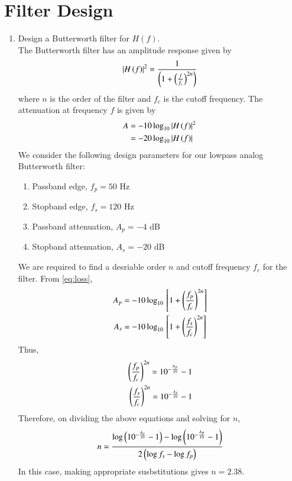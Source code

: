 \documentclass[journal,12pt,twocolumn]{IEEEtran}
\renewcommand\thesection{\arabic{section}}
\begin{document}
\section{Filter Design}
\begin{enumerate}[label=\thesection.\arabic*
,ref=\thesection.\theenumi]
\item Design a Butterworth filter for $H(f)$.\\
\solution The Butterworth filter has an amplitude response
given by
\begin{align}
    \left\vert H\left(f\right)\right\vert^2 = \frac{1}{\left(1 + \left(\frac{f}{f_c}\right)^{2n}\right)}
\end{align}
where $n$ is the order of the filter and $f_c$ is the cutoff
frequency. The attenuation at frequency $f$ is given by 
\begin{align}
    A &= -10\log_{10}\left\vert H\left(f\right)\right\vert^2 \\
      &= -20\log_{10}\left\vert H\left(f\right)\right\vert
    \label{eq:loss}
\end{align}
We consider the following design parameters for our
lowpass analog Butterworth filter:
\begin{enumerate}
    \item Passband edge, $f_p = 50$ Hz
    \item Stopband edge, $f_s = 120$ Hz
    \item Passband attenuation, $A_p = -4$ dB
    \item Stopband attenuation, $A_s = -20$ dB
\end{enumerate}
We are required to find a desriable order $n$ and cutoff
frequency $f_c$ for the filter. From \eqref{eq:loss},
\begin{align}
    A_p &= -10\log_{10}{}\left[1 + \left(\frac{f_p}{f_c}\right)^{2n}\right] \\
    A_s &= -10\log_{10}{}\left[1 + \left(\frac{f_s}{f_c}\right)^{2n}\right]
\end{align}
Thus,
\begin{align}
    \left(\frac{f_p}{f_c}\right)^{2n} = 10^{-\frac{A_p}{10}} - 1 \label{eq:fc1} \\
    \left(\frac{f_s}{f_c}\right)^{2n} = 10^{-\frac{A_s}{10}} - 1 \label{eq:fc2}
\end{align}
Therefore, on dividing the above equations and solving for $n$,
\begin{align}
    n = \frac{\log\left(10^{-\frac{A_s}{10}} - 1\right) - 
    \log\left(10^{-\frac{A_p}{10}} - 1\right)}{2\left(\log{f_s} - \log{f_p}\right)}
\end{align}
In this case, making appropriate susbstitutions gives $n = 2.38$.

\end{enumerate}
\end{document}
